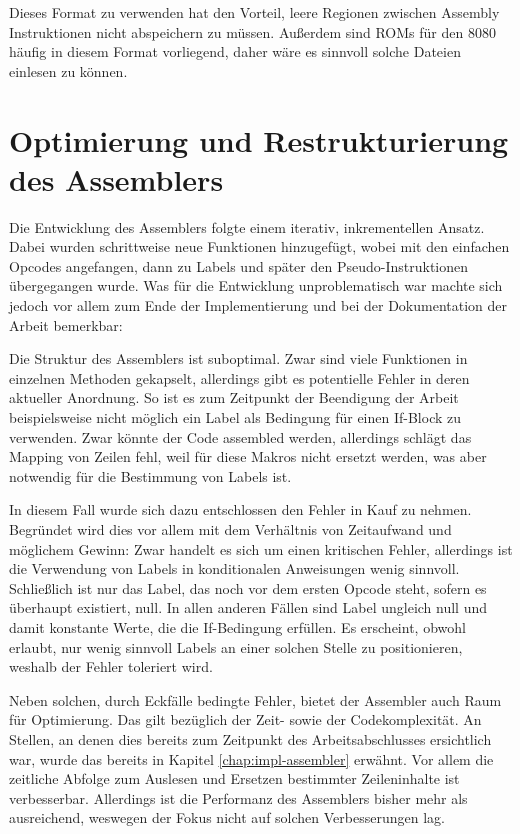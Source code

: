 Dieses Format zu verwenden hat den Vorteil, leere Regionen zwischen Assembly Instruktionen nicht abspeichern zu müssen. Außerdem sind ROMs für den 8080 häufig in diesem Format vorliegend, daher wäre es sinnvoll solche Dateien einlesen zu können.

\section{Optimierung und Restrukturierung des Assemblers}

Die Entwicklung des Assemblers folgte einem iterativ, inkrementellen Ansatz. Dabei wurden schrittweise neue Funktionen hinzugefügt, wobei mit den einfachen Opcodes angefangen, dann zu Labels und später den Pseudo-Instruktionen übergegangen wurde. Was für die Entwicklung unproblematisch war machte sich jedoch vor allem zum Ende der Implementierung und bei der Dokumentation der Arbeit bemerkbar:

Die Struktur des Assemblers ist suboptimal. Zwar sind viele Funktionen in einzelnen Methoden gekapselt, allerdings gibt es potentielle Fehler in deren aktueller Anordnung. So ist es zum Zeitpunkt der Beendigung der Arbeit beispielsweise nicht möglich ein Label als Bedingung für einen If-Block zu verwenden. Zwar könnte der Code assembled werden, allerdings schlägt das Mapping von Zeilen fehl, weil für diese Makros nicht ersetzt werden, was aber notwendig für die Bestimmung von Labels ist.

In diesem Fall wurde sich dazu entschlossen den Fehler in Kauf zu nehmen. Begründet wird dies vor allem mit dem Verhältnis von Zeitaufwand und möglichem Gewinn: Zwar handelt es sich um einen kritischen Fehler, allerdings ist die Verwendung von Labels in konditionalen Anweisungen wenig sinnvoll. Schließlich ist nur das Label, das noch vor dem ersten Opcode steht, sofern es überhaupt existiert, null. In allen anderen Fällen sind Label ungleich null und damit konstante Werte, die die If-Bedingung erfüllen. Es erscheint, obwohl erlaubt, nur wenig sinnvoll Labels an einer solchen Stelle zu positionieren, weshalb der Fehler toleriert wird.

Neben solchen, durch Eckfälle bedingte Fehler, bietet der Assembler auch Raum für Optimierung. Das gilt bezüglich der Zeit- sowie der Codekomplexität. An Stellen, an denen dies bereits zum Zeitpunkt des Arbeitsabschlusses ersichtlich war, wurde das bereits in Kapitel \ref{chap:impl-assembler} erwähnt. Vor allem die zeitliche Abfolge zum Auslesen und Ersetzen bestimmter Zeileninhalte ist verbesserbar. Allerdings ist die Performanz des Assemblers bisher mehr als ausreichend, weswegen der Fokus nicht auf solchen Verbesserungen lag.

